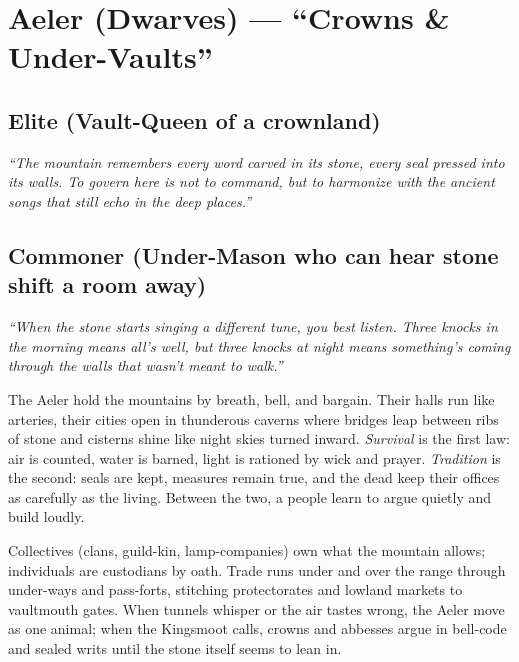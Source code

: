 \section{Aeler (Dwarves) --- ``Crowns \& Under-Vaults''}
\label{chap:aeler}

\subsection*{Elite (Vault-Queen of a crownland)}
\textit{``The mountain remembers every word carved in its stone, every seal pressed into its walls. To govern here is not to command, but to harmonize with the ancient songs that still echo in the deep places.''}

\subsection*{Commoner (Under-Mason who can hear stone shift a room away)}
\textit{``When the stone starts singing a different tune, you best listen. Three knocks in the morning means all's well, but three knocks at night means something's coming through the walls that wasn't meant to walk.''}

\begin{tcolorbox}[colback=black!3,colframe=black!40!white,title={Crowns \& Under-Vaults}]
The Aeler hold the mountains by breath, bell, and bargain. Their halls run like arteries, their cities open in thunderous caverns where bridges leap between ribs of stone and cisterns shine like night skies turned inward. \textit{Survival} is the first law: air is counted, water is barned, light is rationed by wick and prayer. \textit{Tradition} is the second: seals are kept, measures remain true, and the dead keep their offices as carefully as the living. Between the two, a people learn to argue quietly and build loudly.

Collectives (clans, guild-kin, lamp-companies) own what the mountain allows; individuals are custodians by oath. Trade runs under and over the range through under-ways and pass-forts, stitching protectorates and lowland markets to vaultmouth gates. When tunnels whisper or the air tastes wrong, the Aeler move as one animal; when the Kingsmoot calls, crowns and abbesses argue in bell-code and sealed writs until the stone itself seems to lean in.
\end{tcolorbox}

